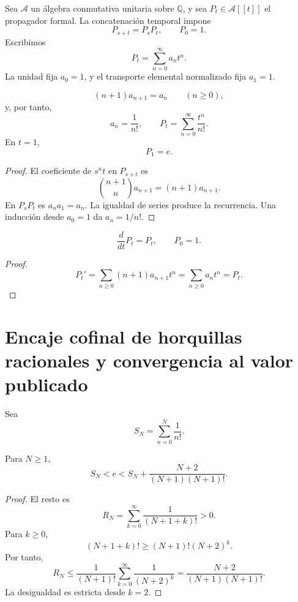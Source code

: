 Sea \(\mathcal A\) un álgebra conmutativa unitaria sobre \(\mathbb Q\), y
sea \(P_t\in\mathcal A[[t]]\) el propagador formal. La concatenación
temporal impone
\[
 P_{s+t}=P_sP_t,
 \qquad
 P_0=1.
\]
Escribimos
\[
 P_t=\sum_{n=0}^{\infty}a_nt^n.
\]
La unidad fija \(a_0=1\), y el transporte elemental normalizado fija
\(a_1=1\).

\begin{theorem}
\label{gfp:b:thm:recurrencia-factorial-e}
\[
 (n+1)a_{n+1}=a_n
 \qquad(n\geq0),
\]
y, por tanto,
\[
 a_n=\frac1{n!},
 \qquad
 P_t=\sum_{n=0}^{\infty}\frac{t^n}{n!}.
\]
En \(t=1\),
\[
 \boxed{P_1=e.}
\]
\end{theorem}

\begin{proof}
El coeficiente de \(s^nt\) en \(P_{s+t}\) es
\[
 \binom{n+1}{n}a_{n+1}=(n+1)a_{n+1}.
\]
En \(P_sP_t\) es \(a_na_1=a_n\). La igualdad de series produce la
recurrencia. Una inducción desde \(a_0=1\) da \(a_n=1/n!\).
\end{proof}

\begin{corollary}
\[
 \frac{d}{dt}P_t=P_t,
 \qquad P_0=1.
\]
\end{corollary}

\begin{proof}
\[
 P_t'=\sum_{n\geq0}(n+1)a_{n+1}t^n
 =\sum_{n\geq0}a_nt^n=P_t.
\]
\end{proof}

\section{Encaje cofinal de horquillas racionales y convergencia al valor publicado}

Sea
\[
 S_N=\sum_{n=0}^{N}\frac1{n!}.
\]

\begin{theorem}
\label{gfp:b:thm:cota-factorial-e}
Para \(N\geq1\),
\begin{equation}
 \boxed{
 S_N<e<
 S_N+\frac{N+2}{(N+1)(N+1)!}.}
 \label{gfp:b:eq:horquilla-factorial-e}
\end{equation}
\end{theorem}

\begin{proof}
El resto es
\[
 R_N=\sum_{k=0}^{\infty}\frac1{(N+1+k)!}>0.
\]
Para \(k\geq0\),
\[
 (N+1+k)!
 \geq(N+1)!(N+2)^k.
\]
Por tanto,
\[
 R_N
 \leq\frac1{(N+1)!}
 \sum_{k=0}^{\infty}\frac1{(N+2)^k}
 =\frac{N+2}{(N+1)(N+1)!}.
\]
La desigualdad es estricta desde \(k=2\).
\end{proof}

